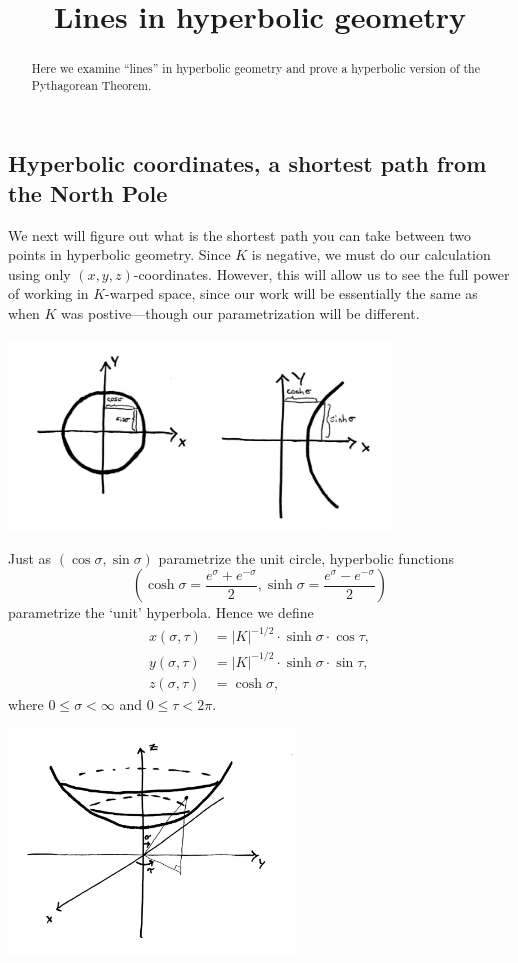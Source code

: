 \documentclass{ximera}
\title{Lines in hyperbolic geometry}
\begin{document}
\begin{abstract}
Here we examine ``lines'' in hyperbolic geometry and prove a
hyperbolic version of the Pythagorean Theorem.
\end{abstract}
\maketitle

\subsection*{Hyperbolic coordinates, a shortest path from the North Pole}

We next will figure out what is the shortest path you can take between
two points in hyperbolic geometry. Since $K$ is negative, we must do
our calculation using only $(x,y,z)$-coordinates. However, this will
allow us to see the full power of working in $K$-warped space, since
our work will be essentially the same as when $K$ was postive---though
our parametrization will be different.
\begin{image}
\includegraphics[width=4in]{trigVsHyp.jpg}
\end{image}


Just as $(\cos\sigma,\sin\sigma)$ parametrize the unit circle,
hyperbolic functions
\[
\left(
\cosh\sigma=\frac{e^{\sigma}+e^{-\sigma}}{2},
\sinh\sigma=\frac{e^{\sigma}-e^{-\sigma}}{2}
\right)
\]
parametrize the `unit' hyperbola. Hence we define
\begin{align*}
  x(\sigma,\tau) &=|K|^{-1/2}\cdot \sinh \sigma\cdot\cos \tau,\\
  y(\sigma,\tau) &=|K|^{-1/2}\cdot\sinh\sigma\cdot\sin \tau,\\
  z(\sigma,\tau) &=\cosh \sigma,
\end{align*}
where $0\le \sigma< \infty$ and $0\le \tau<2\pi$.

\begin{image}
  \includegraphics[width=3in]{hyperbolicPara.jpg}
\end{image}
\end{document}
